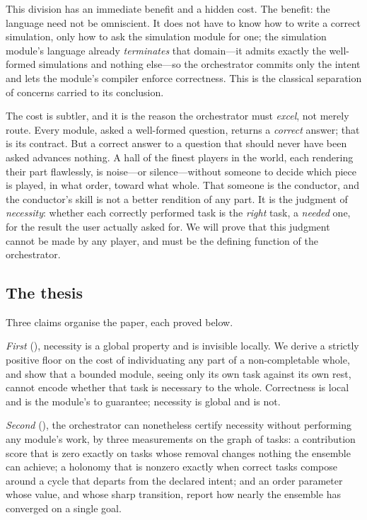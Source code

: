 \documentclass[twocolumn,11pt,a4paper]{article}
\theoremstyle{sup}
\theoremstyle{definition}
\theoremstyle{remark}
\begin{document}
This division has an immediate benefit and a hidden cost. The benefit: the
language need not be omniscient. It does not have to know how to write a correct
simulation, only how to ask the simulation module for one; the simulation
module's language already \emph{terminates} that domain---it admits exactly the
well-formed simulations and nothing else---so the orchestrator commits only the
intent and lets the module's compiler enforce correctness. This is the classical
separation of concerns \citep{dijkstra1972,mernik2005} carried to its conclusion.

The cost is subtler, and it is the reason the orchestrator must \emph{excel}, not
merely route. Every module, asked a well-formed question, returns a
\emph{correct} answer; that is its contract. But a correct answer to a question
that should never have been asked advances nothing. A hall of the finest players
in the world, each rendering their part flawlessly, is noise---or silence---without
someone to decide which piece is played, in what order, toward what whole. That
someone is the conductor, and the conductor's skill is not a better rendition of
any part. It is the judgment of \emph{necessity}: whether each correctly performed
task is the \emph{right} task, a \emph{needed} one, for the result the user
actually asked for. We will prove that this judgment cannot be made by any player,
and must be the defining function of the orchestrator.

\subsection{The thesis}

Three claims organise the paper, each proved below.

\emph{First} (), necessity is a global property and is
invisible locally. We derive a strictly positive floor on the cost of
individuating any part of a non-completable whole, and show that a bounded module,
seeing only its own task against its own rest, cannot encode whether that task is
necessary to the whole. Correctness is local and is the module's to guarantee;
necessity is global and is not.

\emph{Second} (), the
orchestrator can nonetheless certify necessity without performing any module's
work, by three measurements on the graph of tasks: a contribution score that is
zero exactly on tasks whose removal changes nothing the ensemble can achieve; a
holonomy that is nonzero exactly when correct tasks compose around a cycle that
departs from the declared intent; and an order parameter whose value, and whose
sharp transition, report how nearly the ensemble has converged on a single goal.
\end{document}
